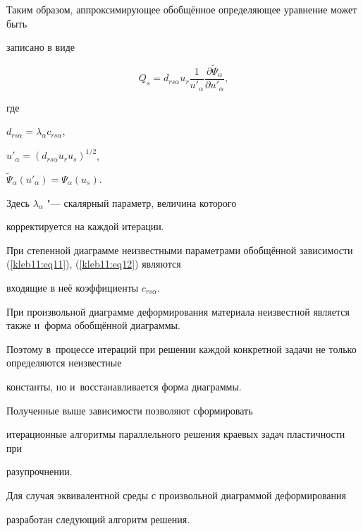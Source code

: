 Таким образом, аппроксимирующее обобщённое определяющее уравнение может быть

записано в виде

\begin{equation}

\label{kleb11:eq13}

 Q_s =d_{rs \alpha } u_r \frac{1}{u'_\alpha }\frac{\partial \tilde {\Psi }_\alpha}{\partial u'_\alpha},

\end{equation}

где

$d_{rs \alpha } =\lambda _\alpha c_{rs \alpha }$, 

$u'_\alpha=\left(d_{rs\alpha} u_r u_s  \right)^{1/2}$,

$\tilde {\Psi}_\alpha \left( u'_\alpha \right)=\Psi_\alpha \left( u_s \right)$.

Здесь $\lambda_\alpha $ "--- скалярный параметр, величина которого

корректируется на каждой итерации.



При степенной диаграмме неизвестными параметрами обобщённой зависимости (\ref{kleb11:eq11}), (\ref{kleb11:eq12}) являются

входящие в неё коэффициенты $c_{rs\alpha}$. 

При произвольной диаграмме деформирования материала неизвестной является также и~форма обобщённой диаграммы. 

Поэтому в~процессе итераций при решении каждой конкретной задачи не только определяются неизвестные

константы, но и~восстанавливается форма диаграммы.



\smallskip



 Полученные выше зависимости позволяют сформировать

итерационные алгоритмы параллельного решения краевых задач пластичности при

разупрочнении.



Для случая эквивалентной среды с произвольной диаграммой деформирования

разработан следующий алгоритм решения.



